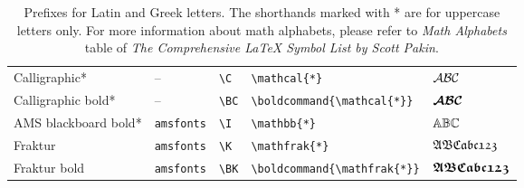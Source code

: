 \documentclass[]{article}
\begin{document}
\begin{table}[htbp]
\begin{tabular}{l l l l l}
    Calligraphic* & -- & \verb+\C+ & \verb+\mathcal{*}+ & ${\mathcal{A}}{\mathcal{B}}{\mathcal{C}}$ \\
    Calligraphic bold* & -- & \verb+\BC+ & \verb+\boldcommand{\mathcal{*}}+ & ${\boldsymbol{\mathcal{A}}}{\boldsymbol{\mathcal{B}}}{\boldsymbol{\mathcal{C}}}$ \\
    AMS blackboard bold* & \texttt{amsfonts} & \verb+\I+ & \verb+\mathbb{*}+ & ${\mathbb{A}}{\mathbb{B}}{\mathbb{C}}$ \\
    Fraktur & \texttt{amsfonts} & \verb+\K+ & \verb+\mathfrak{*}+ & ${\mathfrak{A}}{\mathfrak{B}}{\mathfrak{C}}{\mathfrak{a}}{\mathfrak{b}}{\mathfrak{c}}{\mathfrak{1}}{\mathfrak{2}}{\mathfrak{3}}$\\
    Fraktur bold & \texttt{amsfonts} & \verb+\BK+ & \verb+\boldcommand{\mathfrak{*}}+ & $\boldsymbol{{\mathfrak{A}}}\boldsymbol{{\mathfrak{B}}}\boldsymbol{{\mathfrak{C}}}\boldsymbol{{\mathfrak{a}}}\boldsymbol{{\mathfrak{b}}}\boldsymbol{{\mathfrak{c}}}\boldsymbol{{\mathfrak{1}}}\boldsymbol{{\mathfrak{2}}}\boldsymbol{{\mathfrak{3}}}$\\
    \bottomrule
  \end{tabular}
  \caption{Prefixes for Latin and Greek letters.
    The shorthands marked with * are for uppercase letters only.
    For more information about math
    alphabets, please refer to {\em Math Alphabets} table of
    \emph{The Comprehensive \LaTeX{} Symbol List by Scott Pakin}.
    }
  \label{tb:math}
\end{table}

\end{document}
